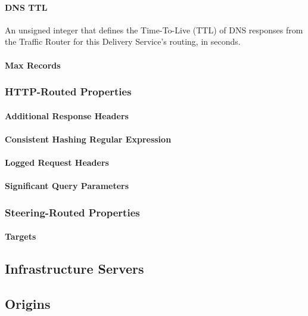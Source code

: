 \paragraph{DNS TTL}
An unsigned integer that defines the Time-To-Live (TTL) of DNS responses from
the Traffic Router for this Delivery Service's routing, in seconds.

\paragraph{Max Records}

\subsubsection{HTTP-Routed Properties}

\paragraph{Additional Response Headers}

\paragraph{Consistent Hashing Regular Expression}

\paragraph{Logged Request Headers}

\paragraph{Significant Query Parameters}

\subsubsection{Steering-Routed Properties}

\paragraph{Targets}



\subsection{Infrastructure Servers}



\subsection{Origins}



